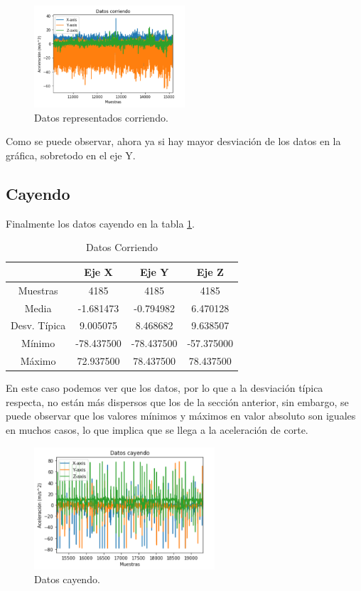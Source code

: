 \documentclass[12pt]{book}
\numberwithin{equation}{section}
\begin{document}
\begin{figure}[h]
    \centering
    \includegraphics[width=0.5\textwidth]{corriendodatos.png}
    \caption{Datos representados corriendo.}
    \label{fig:corriendodatos}
\end{figure}

Como se puede observar, ahora ya si hay mayor desviación de los datos en la gráfica, sobretodo en el eje Y.

\subsection{Cayendo}

Finalmente los datos cayendo en la tabla \ref{tabla6}.

\begin{table}[h]
\centering
\caption{Datos Corriendo}
\begin{tabular}{| c | c | c | c |}
\hline
 & Eje X & Eje Y & Eje Z \\
\hline
Muestras & 4185 & 4185 & 4185 \\
\hline
Media & -1.681473 & -0.794982 & 6.470128 \\
\hline
Desv. Típica & 9.005075 & 8.468682 & 9.638507 \\
\hline
Mínimo & -78.437500 & -78.437500 & -57.375000 \\
\hline
Máximo & 72.937500 & 78.437500 & 78.437500 \\
\hline
\end{tabular}
\label{tabla6}
\end{table}

En este caso podemos ver que los datos, por lo que a la desviación típica respecta, no están más dispersos que los de la sección anterior, sin embargo, se puede observar que los valores mínimos y máximos en valor absoluto son iguales en muchos casos, lo que implica que se llega a la aceleración de corte.

\begin{figure}[h]
    \centering
    \includegraphics[width=0.6\textwidth]{cayendodatos.png}
    \caption{Datos cayendo.}
    \label{fig:cayendodatos}
\end{figure}
\end{document}
